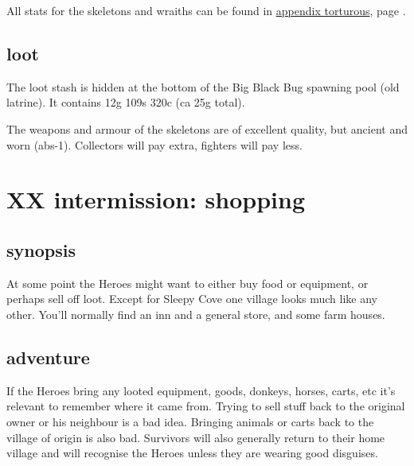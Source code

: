 \noindent All stats for the skeletons and wraiths can be found in \hyperref[appendixtorturous]{appendix torturous}, page \pageref{appendixtorturous}.



\subsection*{loot}

The loot stash is hidden at the bottom of the Big Black Bug spawning pool (old latrine). It contains 12g 109s 320c (ca 25g total).

The weapons and armour of the skeletons are of excellent quality, but ancient and worn (abs-1). Collectors will pay extra, fighters will pay less.












\clearpage
\section*{XX intermission: shopping}


\subsection*{synopsis}

At some point the Heroes might want to either buy food or equipment, or perhaps sell off loot. Except for Sleepy Cove one village looks much like any other. You'll normally find an inn and a general store, and some farm houses.


\subsection*{adventure}

If the Heroes bring any looted equipment, goods, donkeys, horses, carts, etc it's relevant to remember where it came from. Trying to sell stuff back to the original owner or his neighbour is a bad idea. Bringing animals or carts back to the village of origin is also bad. Survivors will also generally return to their home village and will recognise the Heroes unless they are wearing good disguises.

